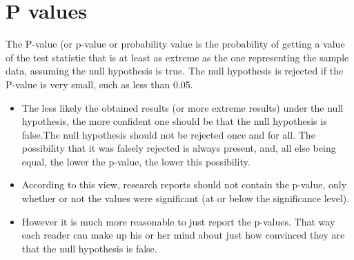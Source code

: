 \documentclass[]{report}
\begin{document}
	
	
	\section{P values}
	
	The P-value (or p-value or probability value is the probability of getting a value of the test statistic that is at least as extreme as the one representing the sample data, assuming the null hypothesis is true.
	The null hypothesis is rejected if the P-value is very small, such as less than 0.05.
	
	
	
	
	
	\begin{itemize}
		\item The less likely the obtained results (or more extreme results) under the null hypothesis, the more confident one should be that the null hypothesis is false.The null hypothesis should not be rejected once and for all. The possibility that it was falsely rejected is always present, and, all else being equal, the lower the p-value, the lower this possibility.
		\item According to this view, research reports should not contain the p-value, only whether or not the values were significant (at or below the significance level).
		\item
		However it is much more reasonable to just report the p-values. That way each reader can make up his or her mind about just how convinced they are that the null hypothesis is false.
	\end{itemize}
	\bigskip
	
\end{document}

